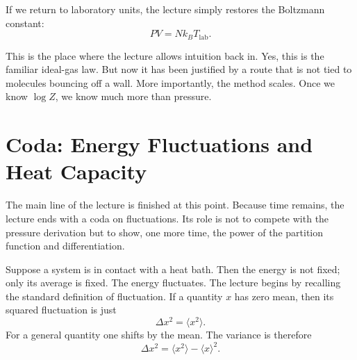 If we return to laboratory units, the lecture simply restores the Boltzmann constant:
\begin{equation}
PV = N k_B T_{\mathrm{lab}}.
\end{equation}

This is the place where the lecture allows intuition back in. Yes, this is the familiar ideal-gas law. But now it has been justified by a route that is not tied to molecules bouncing off a wall. More importantly, the method scales. Once we know \(\log Z\), we know much more than pressure.

\section{Coda: Energy Fluctuations and Heat Capacity}

The main line of the lecture is finished at this point. Because time remains, the lecture ends with a coda on fluctuations. Its role is not to compete with the pressure derivation but to show, one more time, the power of the partition function and differentiation.

Suppose a system is in contact with a heat bath. Then the energy is not fixed; only its average is fixed. The energy fluctuates. The lecture begins by recalling the standard definition of fluctuation. If a quantity \(x\) has zero mean, then its squared fluctuation is just
\begin{equation}
\Delta x^2 = \langle x^2\rangle.
\end{equation}
For a general quantity one shifts by the mean. The variance is therefore
\begin{equation}
\Delta x^2 = \langle x^2\rangle - \langle x\rangle^2.
\end{equation}

